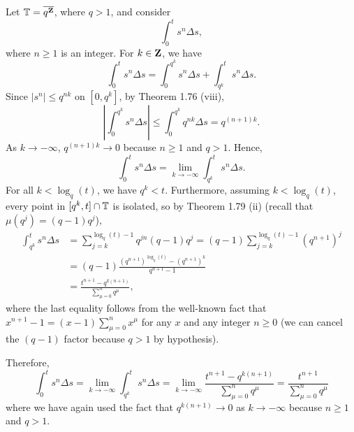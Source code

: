 \documentclass[nonumber]{homework}
\begin{document}
	Let $\mathbb{T} = \overline{q^{\textbf{Z}}}$, where $q > 1$, and consider
	\begin{equation*}
		\int_0^t s^n \Delta s,
	\end{equation*}
	where $n \ge 1$ is an integer. For $k \in \textbf{Z}$, we have
	\begin{equation*}
		\int_0^t s^n\Delta s = \int_0^{q^k} s^n\Delta s + \int_{q^k}^t s^n \Delta s.
	\end{equation*}
	Since $|s^n| \le q^{nk}$ on $[0,q^k]$, by Theorem 1.76 (viii),
	\begin{equation*}
		\left|\int_0^{q^k}s^n\Delta s\right| \le \int_0^{q^k}q^{nk}\Delta s = q^{(n+1)k}.
	\end{equation*}
	As $k \to -\infty$, $q^{(n+1)k} \to 0$ because $n \ge 1$ and $q > 1$. Hence,
	\begin{equation*}
		\int_0^t s^n \Delta s = \lim_{k\to-\infty}\int_{q^k}^t s^n\Delta s.
	\end{equation*}
	For all $k < \log_q(t)$, we have $q^k < t$. Furthermore, assuming $k < \log_q(t)$, every point in $[q^k, t] \cap \mathbb{T}$ is isolated, so by Theorem 1.79 (ii) (recall that $\mu(q^j) = (q-1)q^j$),
	\begin{align*}
		\int_{q^k}^t s^n \Delta s &= \sum_{j = k}^{\log_q(t) - 1} q^{jn}(q-1)q^j = (q-1)\sum_{j=k}^{\log_q(t) - 1}\left(q^{n+1}\right)^j\\
		&= (q-1)\frac{\left(q^{n+1}\right)^{\log_q(t)} - \left(q^{n+1}\right)^k}{q^{n+1} - 1} \\
		&= \frac{t^{n+1} - q^{k(n+1)}}{\sum\limits_{\mu=0}^{n} q^\mu},
	\end{align*}
	where the last equality follows from the well-known fact that $x^{n+1} - 1 = (x-1)\sum\limits_{\mu=0}^n x^\mu$ for any $x$ and any integer $n \ge 0$ (we can cancel the $(q-1)$ factor because $q > 1$ by hypothesis).
	
	Therefore,
	\begin{equation*}
		\int_0^t s^n\Delta s = \lim_{k\to -\infty}\int_{q^k}^ts^n\Delta s = \lim_{k\to-\infty}\frac{t^{n+1} - q^{k(n+1)}}{\sum\limits_{\mu=0}^nq^\mu} = \frac{t^{n+1}}{\sum\limits_{\mu=0}^n q^\mu}
	\end{equation*}
	where we have again used the fact that $q^{k(n+1)} \to 0$ as $k \to -\infty$ because $n \ge 1$ and $q > 1$.
	
\end{document}
